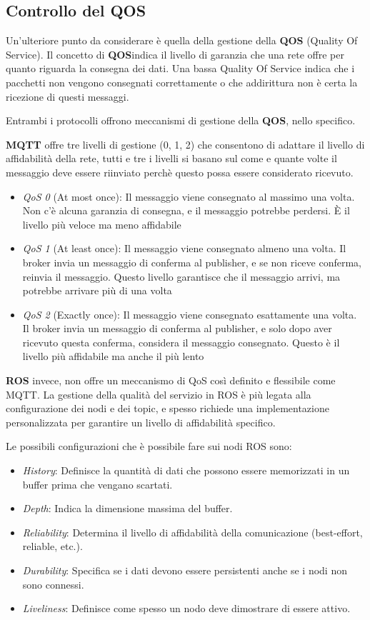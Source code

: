 \subsection{Controllo del QOS}
Un'ulteriore punto da considerare è quella della gestione della \textbf{QOS} (Quality Of Service). Il concetto di \textbf{QOS}indica il livello di garanzia che una rete offre per quanto riguarda la consegna dei dati. Una bassa Quality Of Service indica che i pacchetti non vengono consegnati correttamente o che addirittura non è certa la ricezione di questi messaggi.  

\noindent Entrambi i protocolli offrono meccanismi di gestione della \textbf{QOS}, nello specifico.

\noindent \textbf{MQTT} offre tre livelli di gestione (0, 1, 2) che consentono di adattare il livello di affidabilità della rete, tutti e tre i livelli si basano sul come e quante volte il messaggio deve essere riinviato perchè questo possa essere considerato ricevuto. 

\begin{itemize}
  \item \textit{QoS 0} (At most once): Il messaggio viene consegnato al massimo una volta. Non c'è alcuna garanzia di consegna, e il messaggio potrebbe perdersi. È il livello più veloce ma meno affidabile
  \item \textit{QoS 1} (At least once): Il messaggio viene consegnato almeno una volta. Il broker invia un messaggio di conferma al publisher, e se non riceve conferma, reinvia il messaggio. Questo livello garantisce che il messaggio arrivi, ma potrebbe arrivare più di una volta
  \item \textit{QoS 2} (Exactly once): Il messaggio viene consegnato esattamente una volta. Il broker invia un messaggio di conferma al publisher, e solo dopo aver ricevuto questa conferma, considera il messaggio consegnato. Questo è il livello più affidabile ma anche il più lento
\end{itemize}

\noindent \textbf{ROS} invece, non offre un meccanismo di QoS così definito e flessibile come MQTT. La gestione della qualità del servizio in ROS è più legata alla configurazione dei nodi e dei topic, e spesso richiede una implementazione personalizzata per garantire un livello di affidabilità specifico. 

Le possibili configurazioni che è possibile fare sui nodi ROS sono:
\begin{itemize}
  \item \textit{History}: Definisce la quantità di dati che possono essere memorizzati in un buffer prima che vengano scartati.
  \item \textit{Depth}: Indica la dimensione massima del buffer.
  \item \textit{Reliability}: Determina il livello di affidabilità della comunicazione (best-effort, reliable, etc.).
  \item \textit{Durability}: Specifica se i dati devono essere persistenti anche se i nodi non sono connessi.
  \item \textit{Liveliness}: Definisce come spesso un nodo deve dimostrare di essere attivo.
\end{itemize}
